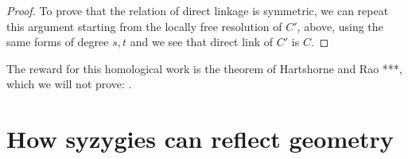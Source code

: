 \begin{proof}
To prove that the relation of direct linkage is symmetric, we can repeat this argument starting from the locally free
resolution of $C'$, above, using the same forms of degree $s,t$ and we see that  direct link of $C'$ is $C$.

\end{proof}

The reward for this homological work is the theorem of Hartshorne and Rao ***, which we will not prove:
.

%
%
%
%
%
%




\section{How syzygies can reflect geometry}\label{syzy and geom}

